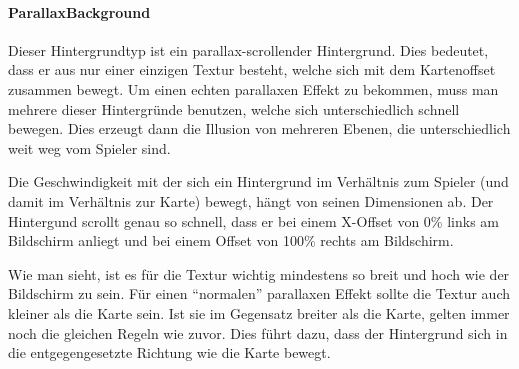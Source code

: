 \paragraph{ParallaxBackground}

Dieser Hintergrundtyp ist ein parallax-scrollender Hintergrund. Dies bedeutet, dass er aus nur einer einzigen Textur besteht, welche sich mit dem Kartenoffset zusammen bewegt. Um einen echten parallaxen Effekt zu bekommen, muss man mehrere dieser Hintergründe benutzen, welche sich unterschiedlich schnell bewegen. Dies erzeugt dann die Illusion von mehreren Ebenen, die unterschiedlich weit weg vom Spieler sind.

Die Geschwindigkeit mit der sich ein Hintergrund im Verhältnis zum Spieler (und damit im Verhältnis zur Karte) bewegt, hängt von seinen Dimensionen ab. Der Hintergund scrollt genau so schnell, dass er bei einem X-Offset von 0\% links am Bildschirm anliegt und bei einem Offset von 100\% rechts am Bildschirm.


Wie man sieht, ist es für die Textur wichtig mindestens so breit und hoch wie der Bildschirm zu sein. Für einen ``normalen'' parallaxen Effekt sollte die Textur auch kleiner als die Karte sein. Ist sie im Gegensatz breiter  als die Karte, gelten immer noch die gleichen Regeln wie zuvor. Dies führt dazu, dass der Hintergrund sich in die entgegengesetzte Richtung wie die Karte bewegt.

